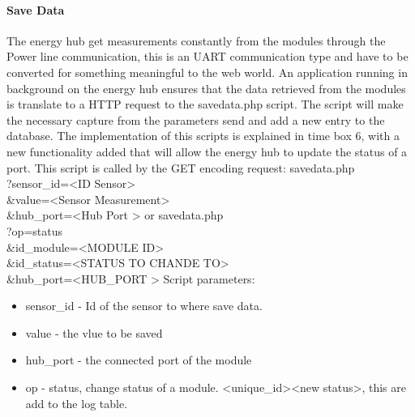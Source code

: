 \paragraph{Save Data}
The energy hub get measurements constantly from the modules through the Power line communication, this is an UART communication type and have to be converted for something meaningful to the web world. An application running in background on the energy hub ensures that the data retrieved from the modules is translate to a HTTP request to the savedata.php script. The script will make the necessary capture from the parameters send and add a new entry to the database. The implementation of this scripts is explained in time box 6, with a new functionality added that will allow the energy hub to update the status of a port.
\p
This script is called by the GET encoding request:
\p
savedata.php \\
?sensor\_id=\textless ID Sensor\textgreater \\
\&value=\textless Sensor Measurement\textgreater \\
\&hub\_port=\textless Hub Port \textgreater
\p
or 
\p
savedata.php\\
?op=status \\
\&id\_module=\textless MODULE ID\textgreater \\
\&id\_status=\textless STATUS TO CHANDE TO\textgreater \\
\&hub\_port=\textless HUB\_PORT \textgreater
\p
Script parameters:
\begin{itemize}
	\item sensor\_id - Id of the sensor to where save data.
	\item value - the vlue to be saved
	\item hub\_port - the connected port of the module
	\item op - status, change status of a module. <unique\_id><new status>, this are add to the log table.
\end{itemize}
